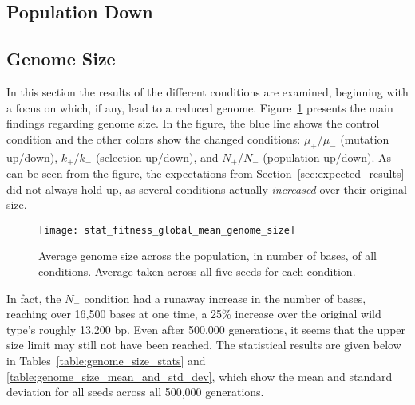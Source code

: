 \subsection{Population Down}

\subsection{Genome Size}\label{sec:genome_size}

In this section the results of the different conditions are examined, beginning with a focus on which, if any, lead to a reduced genome. Figure~\ref{fig:genome_size} presents the main findings regarding genome size. In the figure, the blue line shows the control condition and the other colors show the changed conditions: $\mu_+$/$\mu_-$ (mutation up/down), $k_+$/$k_-$ (selection up/down), and $N_+$/$N_-$ (population up/down). As can be seen from the figure, the expectations from Section~\ref{sec:expected_results} did not always hold up, as several conditions actually \textit{increased} over their original size. 
\begin{figure}[H]
	\texttt{[image: stat\_fitness\_global\_mean\_genome\_size]}
	\centering
	\caption[Genome size]{Average genome size across the population, in number of bases, of all conditions. Average taken across all five seeds for each condition.}
	\label{fig:genome_size}
\end{figure}
In fact, the $N_-$ condition had a runaway increase in the number of bases, reaching over 16,500 bases at one time, a 25\% increase over the original wild type's roughly 13,200 bp. Even after 500,000 generations, it seems that the upper size limit may still not have been reached. The statistical results are given below in Tables~\ref{table:genome_size_stats} and \ref{table:genome_size_mean_and_std_dev}, which show the mean and standard deviation for all seeds across all 500,000 generations. 


